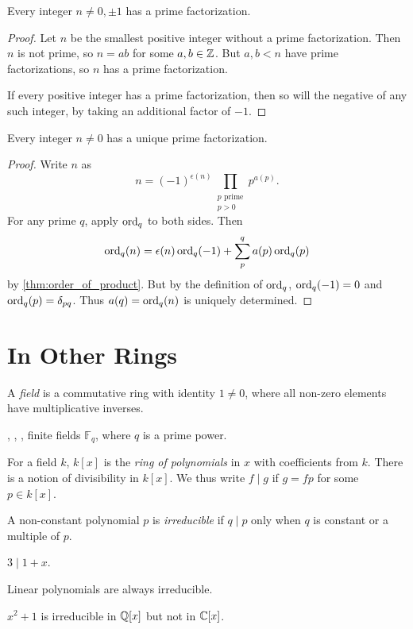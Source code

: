 \begin{lemma} \label{thm:factorization}
    Every integer $n \neq 0, \pm 1$ has a prime factorization.
\end{lemma}
\begin{proof}
    Let $n$ be the smallest positive integer without a prime factorization.
    Then $n$ is not prime, so $n = ab$ for some $a, b \in \mathbb{Z}$.
    But $a, b < n$ have prime factorizations,
    so $n$ has a prime factorization.

    If every positive integer has a prime factorization, then so will the
    negative of any such integer, by taking an additional factor of $-1$.
\end{proof}

\begin{theorem*} \label{thm:ftoa}
    Every integer $n \neq 0$ has a unique prime factorization.
\end{theorem*}
\begin{proof}
    Write $n$ as \[
        n = (-1)^{\epsilon(n)} \prod_{\substack{p \text{ prime} \\ p > 0}}
        p^{a(p)}.
    \] For any prime $q$, apply $\operatorname{ord}_q$ to both sides.
    Then \[
        \operatorname{ord}_q(n) = \epsilon(n) \operatorname{ord}_q(-1) + \sum_p^q a(p) \operatorname{ord}_q(p)
    \] by \cref{thm:order_of_product}.
    But by the definition of $\operatorname{ord}_q$, $\operatorname{ord}_q(-1) = 0$ and
    $\operatorname{ord}_q(p) = \delta_{pq}$.
    Thus $a(q) = \operatorname{ord}_q(n)$ is uniquely determined.
\end{proof}

\section{In Other Rings} \label{sec:general}
\begin{definition}[Field] \label{def:field_again}
    A \emph{field} is a commutative ring with identity $1 \neq 0$,
    where all non-zero elements have multiplicative inverses.
\end{definition}
\begin{example}
    \Q, \R, \C, finite fields $\mathbb{F}_q$, where $q$ is a prime power.
\end{example}

\begin{definition*} \label{def:poly:ring}
    For a field $k$, $k[x]$ is the \emph{ring of polynomials} in $x$ with
    coefficients from $k$.
    There is a notion of divisibility in $k[x]$.
    We thus write $f \mid g$ if $g = f p$ for some $p \in k[x]$.

    A non-constant polynomial $p$ is \emph{irreducible} if $q \mid p$ only when
    $q$ is constant or a multiple of $p$.
\end{definition*}
\begin{examples}
    \item $3 \mid 1 + x$.
    \item Linear polynomials are always irreducible.
    \item $x^2 + 1$ is irreducible in $\mathbb{Q}[x]$ but not in $\mathbb{C}[x]$.
\end{examples}

